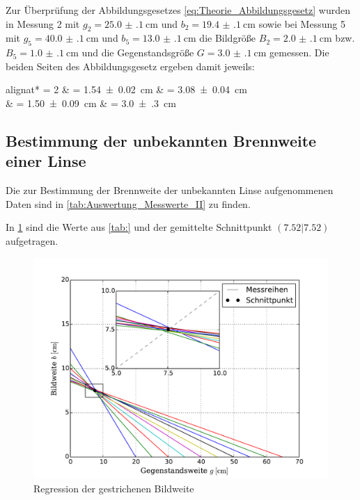	 Zur Überprüfung der Abbildungsgesetzes \cref{eq:Theorie_Abbildungsgesetz} wurden in 
	 Messung 2 mit $g_{2} = \SI{25.0(1)}{\cm}$ und $b_{2} = \SI{19.4(1)}{\cm}$ sowie
	 bei Messung 5 mit $g_{5} = \SI{40.0(1)}{\cm}$ und $b_{5} = \SI{13.0(1)}{\cm}$
	 die Bildgröße $B_{2} = \SI{2.0(1)}{\cm}$ bzw. $B_{5} = \SI{1.0(1)}{\cm}$ und 
	 die Gegenstandsgröße $G = \SI{3.0(1)}{\centi\meter}$ gemessen.
	 Die beiden Seiten des Abbildungsgesetz ergeben damit jeweils:
	 \begin{empheq}{alignat* = 2}
	 	& = \SI{1.54(2)}{\cm} \qquad	& = \SI{3.08(4)}{\cm}\\  
	 	& = \SI{1.50(9)}{\cm}	\qquad     & = \SI{3.0(3)}{\cm}
	 \end{empheq}
	 
	 
	  
\subsection{Bestimmung der unbekannten Brennweite einer Linse}
	
	Die zur Bestimmung der Brennweite der unbekannten Linse aufgenommenen Daten sind in 
	\cref{tab:Auswertung_Messwerte_II} zu finden.
	
	 
	
	In \cref{fig:Auswertung_UnbekannteLinse} sind die Werte aus \cref{tab:} und der gemittelte Schnittpunkt
	$(7.52|7.52)$ aufgetragen.
	
	\begin{figure}[!h]
		\centering
		\includegraphics[scale=.7]{Grafiken/Messwerte_Unbekannt.pdf}
		\caption{Regression der gestrichenen Bildweite\label{fig:Auswertung_UnbekannteLinse}}
	\end{figure}  
	

